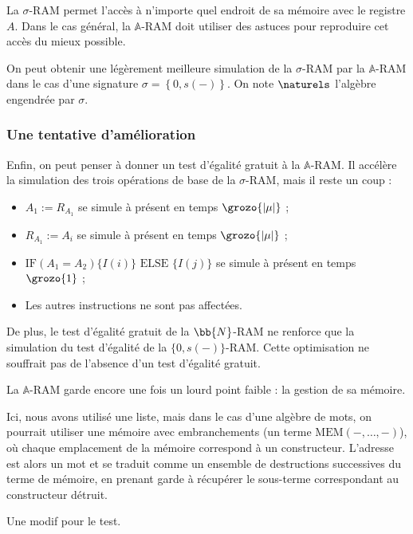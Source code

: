 \documentclass{article}
\newcommand{\sRAMifc}[2]{\text{IF} (A_1=A_2) \{I( #1 )\} \text{ ELSE } \{I( #2 )\}}
\newcommand{\bbA}{\mathbb{A}}
\begin{document}
			La $\sigma$-RAM permet l'accès à n'importe quel endroit de sa mémoire avec le registre $A$. Dans le cas général, la $\bbA$-RAM doit utiliser des astuces pour reproduire cet accès du mieux possible. 
			
			
			On peut obtenir une légèrement meilleure simulation de la $\sigma$-RAM par la $\bbA$-RAM dans le cas d'une signature $\sigma = \left\lbrace 0, s(-)\right\rbrace$. On note $\naturels$ l'algèbre engendrée par $\sigma$.


			\subsubsection{Une tentative d'amélioration}

			
			Enfin, on peut penser à donner un test d'égalité gratuit à la $\bbA$-RAM. Il accélère la simulation des trois opérations de base de la $\sigma$-RAM, mais il reste un coup : 
			
			\begin{itemize}[itemsep=-1mm]
				\item 	$A_1 := R_{A_1}$ se simule à présent en temps $\grozo{\left| \mu \right|}$ ;
				\item 	$R_{A_1} := A_i$ se simule à présent en temps $\grozo{\left| \mu \right|}$ ;
				\item 	$\sRAMifc{i}{j}$ se simule à présent en temps $\grozo{1}$ ;
				\item 	Les autres instructions ne sont pas affectées.
			\end{itemize}
			
			De plus, le test d'égalité gratuit de la $\bb{N}$-RAM ne renforce que la simulation du test d'égalité de la $\{0,s(-)\}$-RAM. Cette optimisation ne souffrait pas de l'absence d'un test d'égalité gratuit. 
			
			La $\bbA$-RAM garde encore une fois un lourd point faible : la gestion de sa mémoire.
			
			Ici, nous avons utilisé une liste, mais dans le cas d'une algèbre de mots, on pourrait utiliser une mémoire avec embranchements (un terme $\text{MEM}\left( -, \dots, -\right)$), où chaque emplacement de la mémoire correspond à un constructeur. L'adresse est alors un mot et se traduit comme un ensemble de destructions successives du terme de mémoire, en prenant garde à récupérer le sous-terme correspondant au constructeur détruit.
			
			
			Une modif pour le test.
\end{document}
